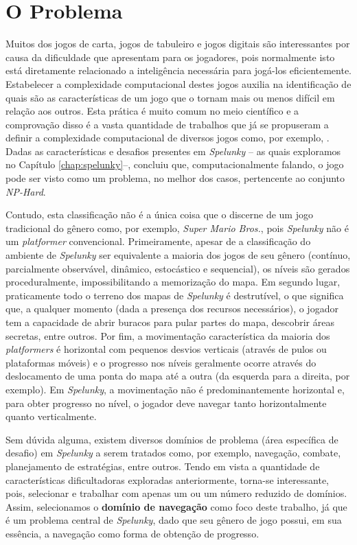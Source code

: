 \section{\label{section:problem}O Problema}
Muitos dos jogos de carta, jogos de tabuleiro e jogos digitais são interessantes
por causa da dificuldade que apresentam para os jogadores, pois normalmente isto
está diretamente relacionado a inteligência necessária para jogá-los
eficientemente.  Estabelecer a complexidade computacional destes jogos auxilia
na identificação de quais são as características de um jogo que o tornam mais ou
menos difícil em relação aos outros. Esta prática é muito comum no meio
científico e a comprovação disso é a vasta quantidade de trabalhos que já se
propuseram a definir a complexidade computacional de diversos jogos como, por
exemplo, \cite{classic_nintendo_games_hard, playing_games_algorithms,
computational_complexity_platformers}. Dadas as características e desafios
presentes em \textit{Spelunky} -- as quais exploramos no Capítulo
\ref{chap:spelunky}--, \cite{SPELUNKYHARD} concluiu que, computacionalmente
falando, o jogo pode ser visto como um problema, no melhor dos casos,
pertencente ao conjunto \textit{NP-Hard}.

Contudo, esta classificação não é a única coisa que o discerne de um jogo
tradicional do gênero como, por exemplo, \textit{Super Mario Bros.}, pois
\textit{Spelunky} não é um \textit{platformer} convencional. Primeiramente,
apesar de a classificação do ambiente de \textit{Spelunky} ser equivalente a
maioria dos jogos de seu gênero (contínuo, parcialmente observável, dinâmico,
estocástico e sequencial), os níveis são gerados proceduralmente,
impossibilitando a memorização do mapa. Em segundo lugar, praticamente todo o
terreno dos mapas de \textit{Spelunky} é destrutível, o que significa que, a
qualquer momento (dada a presença dos recursos necessários), o jogador tem a
capacidade de abrir buracos para pular partes do mapa, descobrir áreas secretas,
entre outros. Por fim, a movimentação característica da maioria dos
\textit{platformers} é horizontal com pequenos desvios verticais (através de
pulos ou plataformas móveis) e o progresso nos níveis geralmente ocorre através
do deslocamento de uma ponta do mapa até a outra (da esquerda para a direita,
por exemplo). Em \textit{Spelunky}, a movimentação não é predominantemente
horizontal e, para obter progresso no nível, o jogador deve navegar tanto
horizontalmente quanto verticalmente.

Sem dúvida alguma, existem diversos domínios de problema (área específica de
desafio) em \textit{Spelunky} a serem tratados como, por exemplo, navegação,
combate, planejamento de estratégias, entre outros. Tendo em vista a quantidade
de características dificultadoras exploradas anteriormente, torna-se
interessante, pois, selecionar e trabalhar com apenas um ou um número reduzido
de domínios. Assim, selecionamos o \textbf{domínio de navegação} como foco deste
trabalho, já que é um problema central de \textit{Spelunky}, dado que seu gênero
de jogo possui, em sua essência, a navegação como forma de obtenção de
progresso.

